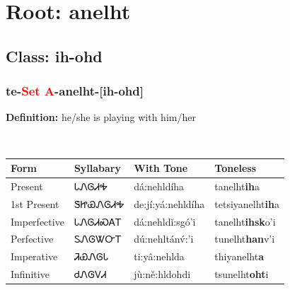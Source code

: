 \needspace{4in}
\section*{Root: anelht}
\nopagebreak
{}
\needspace{3in}
\subsection*{Class: ih-ohd}
\nopagebreak
\needspace{2in}
\subsubsection*{te{-}\textcolor{Red}{Set A}{-}\textbf{anelht}{-}[ih-ohd]}
\nopagebreak
\textbf{Definition: } he/she is playing with him/her
\\[0.5em]
\begin{tabularx}{\textwidth}{l X X X}%
\toprule%
\textbf{Form}&\textbf{Syllabary}&\textbf{With Tone}&\textbf{Toneless}\\%
\midrule%
Present&ᏓᏁᎶᏗᎭ&dá:nehldíha&tanelht\textbf{ih}a\\%
1st Present&ᏕᏥᏯᏁᎶᏗᎭ&de:jí:yá:nehldíha&tetsiyanelht\textbf{ih}a\\%
Imperfective&ᏓᏁᎶᏗᏍᎪᎢ&dá:nehldǐ:sgó’i&tanelht\textbf{ihsk}o'i\\%
Perfective&ᏚᏁᎶᏔᏅᎢ&dú:nehltánv́:’i&tunelht\textbf{han}v'i\\%
Imperative&ᏘᏯᏁᎶᏓ&ti:yâ:nehlda&thiyanelht\textbf{a}\\%
Infinitive&ᏧᏁᎶᏙᏗ&jù:ně:hldohdi&tsunelht\textbf{oht}i\\%
\bottomrule%
\end{tabularx}
\\[1em]